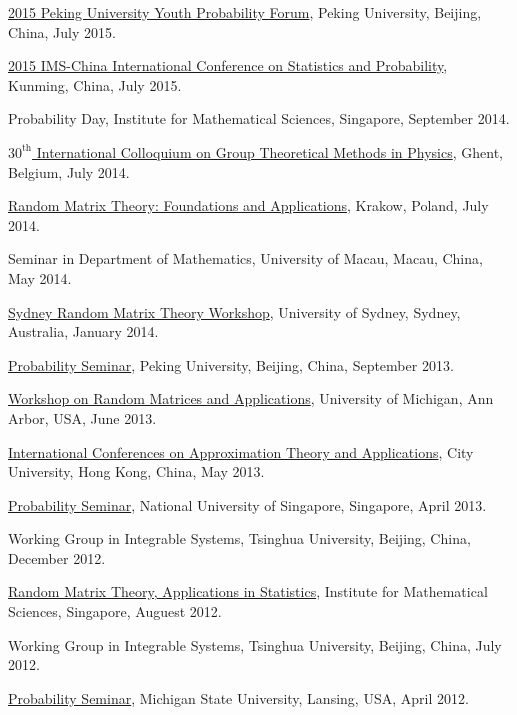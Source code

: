 \documentclass[12pt,a4paper]{article}
\newenvironment{item_list}{
 \begin{list}{}{
   \setlength{\leftmargin}{1.5em}
   \setlength{\itemsep}{0.25em}
   \setlength{\parskip}{0pt}
   \setlength{\parsep}{0.25em}
 }
}{
 \end{list}
}
\begin{document}
\begin{item_list}
\item
  \href{http://www.math.pku.edu.cn/teachers/liuyong/2015forum/admin/html/default.php}{2015 Peking University Youth Probability Forum}, Peking University, Beijing, China, July 2015.
\item
  \href{http://www.2015imschina.com/}{2015 IMS-China International Conference on Statistics and Probability}, Kunming, China, July 2015.
\item
  Probability Day, Institute for Mathematical Sciences, Singapore, September 2014.
\item \href{http://th-www.if.uj.edu.pl/~matrix2014/index.html}{$30^{\text{th}}$ International Colloquium on Group Theoretical Methods in Physics}, Ghent, Belgium, July 2014.
\item
  \href{http://th-www.if.uj.edu.pl/~matrix2014/index.html}{Random Matrix Theory: Foundations and Applications}, Krakow, Poland, July 2014.
\item
  Seminar in Department of Mathematics, University of Macau, Macau, China, May 2014.
\item
  \href{http://www.maths.usyd.edu.au/u/olver/conferences/RMT.html}{Sydney Random Matrix Theory Workshop}, University of Sydney, Sydney, Australia, January 2014. 
\item
  \href{http://www.math.pku.edu.cn/teachers/liuyong/seminarC.htm}{Probability Seminar}, Peking University, Beijing, China, September 2013.
\item
  \href{http://web.eecs.umich.edu/~rajnrao/rmt2013/}{Workshop on Random Matrices and Applications}, University of Michigan, Ann Arbor, USA, June 2013.
\item
  \href{http://www6.cityu.edu.hk/ma/maicata/}{International Conferences on Approximation Theory and Applications}, City University, Hong Kong, China, May 2013.
\item
  \href{http://ww1.math.nus.edu.sg/seminars.aspx?CatID=9}{Probability Seminar}, National University of Singapore, Singapore, April 2013.
\item
  Working Group in Integrable Systems, Tsinghua University, Beijing, China, December 2012.
\item
  \href{http://www2.ims.nus.edu.sg/Programs/012random/wk2.php}{Random Matrix Theory, Applications in Statistics}, Institute for Mathematical Sciences, Singapore, Auguest 2012.
\item
  Working Group in Integrable Systems, Tsinghua University, Beijing, China, July 2012.
\item
  \href{http://mathdata.msu.edu/Seminar/Recent.asp?s=928}{Probability Seminar}, Michigan State University, Lansing, USA, April 2012.

\end{item_list}
\end{document}
